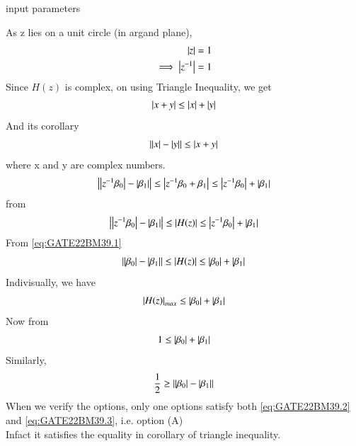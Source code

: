 \documentclass[journal,12pt,onecolumn]{IEEEtran}
\theoremstyle{remark}
\begin{document}
\begin{table}[!ht]
    \centering
        
    \caption{input parameters}
    \label{tab:GATE22BM39.1}
\end{table}
As z lies on a unit circle (in argand plane),
\begin{align}
\abs{z} &= 1 \\\implies
\abs{z^{-1}} &= 1 \label {eq:GATE22BM39.1}
\end{align}
Since $H(z)$ is complex, on using Triangle Inequality, we get
\begin{align}
\left\vert x + y\right\vert \leq \left\vert x\right\vert + \left\vert y\right\vert 
\end{align}
And its corollary
\begin{align}
\left\vert\left\vert x\right\vert-\left\vert y\right\vert\right\vert \leq \left\vert x + y\right\vert
\end{align}
where x and y are complex numbers.
\begin{align}
\left\vert\left\vert z^{-1}\beta_0\right\vert-\left\vert\beta_1\right\vert\right\vert \leq \left\vert z^{-1}\beta_0 + \beta_1\right\vert \leq \left\vert z^{-1}\beta_0\right\vert + \left\vert\beta_1\right\vert 
\end{align}
from 
\begin{align}
\left\vert\left\vert z^{-1}\beta_0\right\vert-\left\vert\beta_1\right\vert\right\vert \leq \left\vert H(z)\right\vert \leq \left\vert z^{-1}\beta_0\right\vert + \left\vert\beta_1\right\vert
\end{align}
From \eqref{eq:GATE22BM39.1} 
\begin{align}
\left\vert\left\vert\beta_0\right\vert-\left\vert\beta_1\right\vert\right\vert \leq \left\vert H(z)\right\vert \leq \left\vert\beta_0\right\vert + \left\vert\beta_1\right\vert 
\end{align}
Indivisually, we have
\begin{align}
\left\vert H(z)\right\vert_{max} \leq \left\vert\beta_0\right\vert + \left\vert\beta_1\right\vert 
\end{align}
Now from 
\begin{align}
1 \leq \abs{\beta_0} + \abs{\beta_1} \label {eq:GATE22BM39.2}
\end{align}
Similarly,
\begin{align}
\frac{1}{2} \geq \abs{\abs{\beta_0}-\abs{\beta_1}} \label {eq:GATE22BM39.3}
\end{align}
When we verify the options, only one options satisfy both \eqref{eq:GATE22BM39.2} and \eqref{eq:GATE22BM39.3}, i.e. option (A) \\
Infact it satisfies the equality in corollary of triangle inequality.
\end{document}
